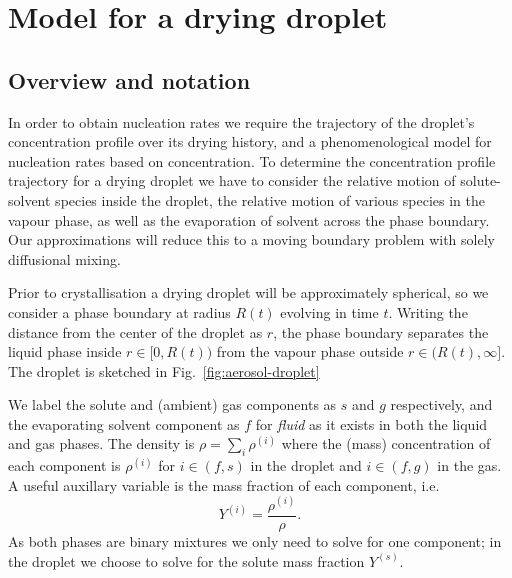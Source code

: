 \documentclass[11pt,twoside]{report}
\begin{document}
\section{Model for a drying droplet}
\label{sec:evolution}

\subsection{Overview and notation}

In order to obtain nucleation rates we require the trajectory of the droplet's concentration profile over its drying history, and a phenomenological model for nucleation rates based on concentration.
To determine the concentration profile trajectory for a drying droplet we have to consider the relative motion of solute-solvent species inside the droplet, the relative motion of various species in the vapour phase, as well as the evaporation of solvent across the phase boundary.
Our approximations will reduce this to a moving boundary problem with solely diffusional mixing.

Prior to crystallisation a drying droplet will be approximately spherical, so we consider a phase boundary at radius $R(t)$ evolving in time $t$.
Writing the distance from the center of the droplet as $r$, the phase boundary separates the liquid phase inside $r \in [0, R(t))$ from the vapour phase outside $r \in (R(t), \infty]$.
The droplet is sketched in Fig.\ \ref{fig:aerosol-droplet}

We label the solute and (ambient) gas components as $s$ and $g$ respectively, and the evaporating solvent component as $f$ for \emph{fluid} as it exists in both the liquid and gas phases.
The density is $\rho = \sum_i \rho^{(i)}$ where the (mass) concentration of each component is $\rho^{(i)}$ for $i \in (f,s)$ in the droplet and $i \in (f,g)$ in the gas.
A useful auxillary variable is the mass fraction of each component, i.e.\
\begin{equation}\label{eq:mass-fraction}
  Y^{(i)} = \frac{\rho^{(i)}}{\rho}.
\end{equation}
As both phases are binary mixtures we only need to solve for one component; in the droplet we choose to solve for the solute mass fraction $Y^{(s)}$.
\end{document}
